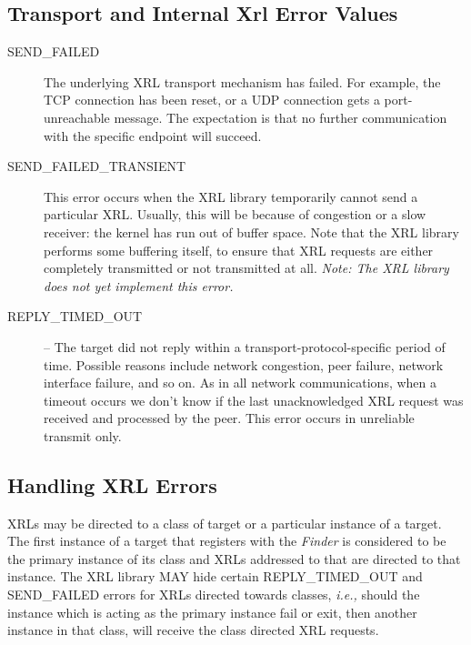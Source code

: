 \documentclass[11pt]{article}
\makeatletter
\newcommand{\ie}{\emph{i.e.,}\xspace}
\newcommand{\finder} {{\em Finder}\@\xspace}
\makeatother
\begin{document}
\subsection*{Transport and Internal Xrl Error Values}

\begin{description}

\item [SEND\_FAILED] The underlying XRL transport mechanism has failed.
For example, the TCP connection has been reset, or a UDP connection gets a
port-unreachable message. The expectation is that no further communication
with the specific endpoint will succeed.

\item [SEND\_FAILED\_TRANSIENT] This error occurs when the XRL library
temporarily cannot send a particular XRL. Usually, this will be because of
congestion or a slow receiver: the kernel has run out of buffer space. Note
that the XRL library performs some buffering itself, to ensure that XRL
requests are either completely transmitted or not transmitted at all.
\emph{Note: The XRL library does not yet implement this error.}

\item [REPLY\_TIMED\_OUT] -- The target did not reply within a
transport-protocol-specific period of time. Possible reasons include
network congestion, peer failure, network interface failure, and so on. As
in all network communications, when a timeout occurs we don't know if the
last unacknowledged XRL request was received and processed by the peer.
This error occurs in unreliable transmit only.

\end{description}

\subsection{Handling XRL Errors}

XRLs may be directed to a class of target or a particular instance of
a target.  The first instance of a target that registers with the
\finder is considered to be the primary instance of its class and XRLs
addressed to that are directed to that instance.  The XRL library MAY
hide certain REPLY\_TIMED\_OUT and SEND\_FAILED errors for XRLs
directed towards classes, \ie should the instance which is acting as
the primary instance fail or exit, then another instance in that
class, will receive the class directed XRL requests.

%
%
\end{document}
